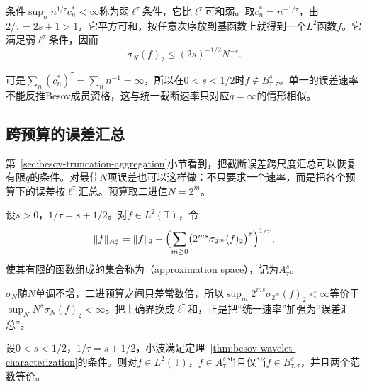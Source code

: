 条件$\sup_nn^{1/\tau}c_n^*<\infty$称为弱$\ell^\tau$条件，它比$\ell^\tau$可和弱。取$c_n^*=n^{-1/\tau}$，由$2/\tau=2s+1>1$，它平方可和，按任意次序放到基函数上就得到一个$L^2$函数$f$。它满足弱$\ell^\tau$条件，因而
\[
 \sigma_N(f)_2\leq(2s)^{-1/2}N^{-s}.
\]

可是$\sum_n(c_n^*)^\tau=\sum_nn^{-1}=\infty$，所以在$0<s<1/2$时$f\notin B^s_{\tau,\tau}$。单一的误差速率不能反推Besov成员资格，这与统一截断速率只对应$q=\infty$的情形相似。

\subsection{跨预算的误差汇总}
\label{sec:besov-approximation-spaces}

第~\ref{sec:besov-truncation-aggregation}小节看到，把截断误差跨尺度汇总可以恢复有限$q$的条件。对最佳$N$项误差也可以这样做：不只要求一个速率，而是把各个预算下的误差按$\ell^\tau$汇总。预算取二进值$N=2^m$。

\begin{definition}[逼近空间]
\label{def:besov-approximation-space}
设$s>0$，$1/\tau=s+1/2$。对$f\in L^2(\mathbb T)$，令
\begin{equation}
 \lVert f\rVert_{A^s_\tau}=\lVert f\rVert_2+\Bigl(\sum_{m\geq0}\bigl(2^{ms}\sigma_{2^m}(f)_2\bigr)^\tau\Bigr)^{1/\tau},
 \label{eq:besov-approximation-space}
\end{equation}
使其有限的函数组成的集合称为（approximation space），记为$A^s_\tau$。
\end{definition}

$\sigma_N$随$N$单调不增，二进预算之间只差常数倍，所以$\sup_m2^{ms}\sigma_{2^m}(f)_2<\infty$等价于$\sup_NN^s\sigma_N(f)_2<\infty$。把上确界换成$\ell^\tau$和，正是把“统一速率”加强为“误差汇总”。

\begin{theorem}[逼近空间与Besov空间]
\label{thm:besov-approximation-equals-besov}
设$0<s<1/2$，$1/\tau=s+1/2$，小波满足定理~\ref{thm:besov-wavelet-characterization}的条件。则对$f\in L^2(\mathbb T)$，$f\in A^s_\tau$当且仅当$f\in B^s_{\tau,\tau}$，并且两个范数等价。
\end{theorem}

